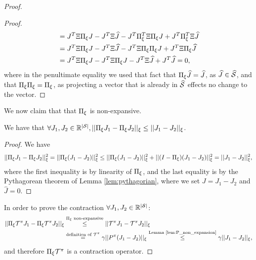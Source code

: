 \begin{proof}
\begin{proof}
\begin{equation*}
\begin{split}
        &= J^T \Xi \Pi_\xi J - J^T \Xi \widehat{J} - J^T \Pi_\xi^T \Xi \Pi_\xi J + J^T \Pi_\xi^T \Xi \widehat{J} \\
        &= J^T \Xi \Pi_\xi J - J^T \Xi \widehat{J} - J^T \Xi \Pi_\xi \Pi_\xi J + J^T \Xi\Pi_\xi \widehat{J} \\
        &= J^T \Xi \Pi_\xi J - J^T \Xi \Pi_\xi J - J^T \Xi \widehat{J} + J^T \widehat{J} = 0,
    \end{split}
\end{equation*}
where in the penultimate equality we used that fact that $\Pi_\xi \widehat{J} = \widehat{J}$, as $\widehat{J}\in \widehat{\mathcal{S}}$, and that $\Pi_\xi \Pi_\xi = \Pi_\xi$, as projecting a vector that is already in $\widehat{\mathcal{S}}$ effects no change to the vector.
\end{proof}

We now claim that that $\Pi_\xi$ is non-expansive.
\begin{lemma}
We have that $\forall {J}_1,{J}_2\in \mathbb{R}^{|\mathcal{S}|}, ||\Pi_\xi {J}_1 - \Pi_\xi {J}_2||_\xi \le ||{J}_1-{J}_2||_\xi$.
\end{lemma}

\begin{proof}
We have
$$||\Pi_\xi {J}_1 - \Pi_\xi {J}_2||_\xi^2 = ||\Pi_\xi({J}_1-{J}_2)||_\xi^2 \le ||\Pi_\xi({J}_1-{J}_2)||_\xi^2 + ||(I-\Pi_\xi)({J}_1-{J}_2)||_\xi^2 = ||{J}_1-{J}_2||_\xi^2,$$
where the first inequality is by linearity of $\Pi_\xi$, and the last equality is by the Pythagorean theorem of Lemma \ref{lem:pythagorian}, where we set $J={J}_1-{J}_2$ and $\widehat{J} = 0$.
\end{proof}

In order to prove the contraction $\forall {J}_1,{J}_2\in \mathbb{R}^{|\mathcal{S}|}$:
\begin{equation*}
\begin{split}
||\Pi_\xi \mathcal{T}^\pi {J}_1 - \Pi_\xi \mathcal{T}^\pi {J}_2||_\xi &\overset{\Pi_\xi \textrm{ non-expansive}}{\le} ||\mathcal{T}^\pi {J}_1 - \mathcal{T}^\pi {J}_2||_\xi\\
&\overset{\textrm{definition of } \mathcal{T}^\pi}{=} \gamma||P^\pi({J}_1-{J}_2)||_\xi \overset{\textrm{Lemma \ref{lem:P_non_expansion}}}{\le} \gamma||{J}_1-{J}_2||_\xi ,
\end{split}
\end{equation*}
and therefore $\Pi_\xi \mathcal{T}^\pi$ is a contraction operator.


\end{proof}
